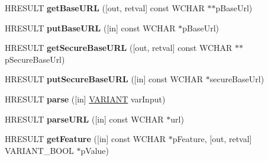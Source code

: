 \begin{DoxyCompactItemize}
\item 
\mbox{\label{interface_m_s_x_m_l2_1_1_i_s_a_x_x_m_l_reader_ac3d769c1f98544b1529c9bf1d8414001}} 
H\+R\+E\+S\+U\+LT {\bfseries get\+Base\+U\+RL} (\mbox{[}out, retval\mbox{]} const W\+C\+H\+AR $\ast$$\ast$p\+Base\+Url)
\item 
\mbox{\label{interface_m_s_x_m_l2_1_1_i_s_a_x_x_m_l_reader_a71ccab7a10c85e01735016217f858263}} 
H\+R\+E\+S\+U\+LT {\bfseries put\+Base\+U\+RL} (\mbox{[}in\mbox{]} const W\+C\+H\+AR $\ast$p\+Base\+Url)
\item 
\mbox{\label{interface_m_s_x_m_l2_1_1_i_s_a_x_x_m_l_reader_a6c34df52f6f338dc73a2140725ad19ac}} 
H\+R\+E\+S\+U\+LT {\bfseries get\+Secure\+Base\+U\+RL} (\mbox{[}out, retval\mbox{]} const W\+C\+H\+AR $\ast$$\ast$p\+Secure\+Base\+Url)
\item 
\mbox{\label{interface_m_s_x_m_l2_1_1_i_s_a_x_x_m_l_reader_ade23c6619f395fc5fe6033e561d26252}} 
H\+R\+E\+S\+U\+LT {\bfseries put\+Secure\+Base\+U\+RL} (\mbox{[}in\mbox{]} const W\+C\+H\+AR $\ast$secure\+Base\+Url)
\item 
\mbox{\label{interface_m_s_x_m_l2_1_1_i_s_a_x_x_m_l_reader_a3fed08f3d23509888e44247fcb324037}} 
H\+R\+E\+S\+U\+LT {\bfseries parse} (\mbox{[}in\mbox{]} \hyperlink{structtag_v_a_r_i_a_n_t}{V\+A\+R\+I\+A\+NT} var\+Input)
\item 
\mbox{\label{interface_m_s_x_m_l2_1_1_i_s_a_x_x_m_l_reader_af8d485acaa36cd560c26cfc4d0528657}} 
H\+R\+E\+S\+U\+LT {\bfseries parse\+U\+RL} (\mbox{[}in\mbox{]} const W\+C\+H\+AR $\ast$url)
\item 
\mbox{\label{interface_m_s_x_m_l2_1_1_i_s_a_x_x_m_l_reader_a2869eb968a5789cd386f77d041f06b1c}} 
H\+R\+E\+S\+U\+LT {\bfseries get\+Feature} (\mbox{[}in\mbox{]} const W\+C\+H\+AR $\ast$p\+Feature, \mbox{[}out, retval\mbox{]} V\+A\+R\+I\+A\+N\+T\+\_\+\+B\+O\+OL $\ast$p\+Value)
\item 
\mbox{\label{interface_m_s_x_m_l2_1_1_i_s_a_x_x_m_l_reader_a966dda0d9b7c8bb70dce9fa2c6b64f3a}} 

\end{DoxyCompactItemize}
